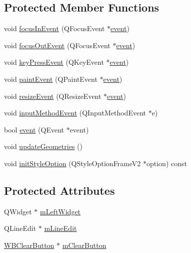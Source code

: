 \subsection*{Protected Member Functions}
\begin{DoxyCompactItemize}
\item 
void \hyperlink{class_w_b_ex_line_edit_a2a7a01d15589a4921018362bff1c1061}{focus\-In\-Event} (Q\-Focus\-Event $\ast$\hyperlink{class_w_b_ex_line_edit_ab1bce2b599c0e2602b4fbe5ad19b5a7e}{event})
\item 
void \hyperlink{class_w_b_ex_line_edit_a821586f13fc0fae7b4db5056b8aa7263}{focus\-Out\-Event} (Q\-Focus\-Event $\ast$\hyperlink{class_w_b_ex_line_edit_ab1bce2b599c0e2602b4fbe5ad19b5a7e}{event})
\item 
void \hyperlink{class_w_b_ex_line_edit_a1878c2689872b926fad31ec3f5929242}{key\-Press\-Event} (Q\-Key\-Event $\ast$\hyperlink{class_w_b_ex_line_edit_ab1bce2b599c0e2602b4fbe5ad19b5a7e}{event})
\item 
void \hyperlink{class_w_b_ex_line_edit_a02a0010757f97a803be57a022483adbf}{paint\-Event} (Q\-Paint\-Event $\ast$\hyperlink{class_w_b_ex_line_edit_ab1bce2b599c0e2602b4fbe5ad19b5a7e}{event})
\item 
void \hyperlink{class_w_b_ex_line_edit_ab289926953e89e5426d19f50e5db71cd}{resize\-Event} (Q\-Resize\-Event $\ast$\hyperlink{class_w_b_ex_line_edit_ab1bce2b599c0e2602b4fbe5ad19b5a7e}{event})
\item 
void \hyperlink{class_w_b_ex_line_edit_aa675b3730f84bba481d4aa83d4ee5247}{input\-Method\-Event} (Q\-Input\-Method\-Event $\ast$e)
\item 
bool \hyperlink{class_w_b_ex_line_edit_ab1bce2b599c0e2602b4fbe5ad19b5a7e}{event} (Q\-Event $\ast$event)
\item 
void \hyperlink{class_w_b_ex_line_edit_a7798d1c875d908b7efc1d3f987b433fb}{update\-Geometries} ()
\item 
void \hyperlink{class_w_b_ex_line_edit_a4c9c286ad93cbd2ec4df7de9a13e7cec}{init\-Style\-Option} (Q\-Style\-Option\-Frame\-V2 $\ast$option) const 
\end{DoxyCompactItemize}
\subsection*{Protected Attributes}
\begin{DoxyCompactItemize}
\item 
Q\-Widget $\ast$ \hyperlink{class_w_b_ex_line_edit_a39f9e6233d3184edda737d1bea2b356e}{m\-Left\-Widget}
\item 
Q\-Line\-Edit $\ast$ \hyperlink{class_w_b_ex_line_edit_a43fd1d49e8339c475bbfbcce357b9ce5}{m\-Line\-Edit}
\item 
\hyperlink{class_w_b_clear_button}{W\-B\-Clear\-Button} $\ast$ \hyperlink{class_w_b_ex_line_edit_acff3e8a85c6f0b78bf0824b8029ccad2}{m\-Clear\-Button}
\end{DoxyCompactItemize}


